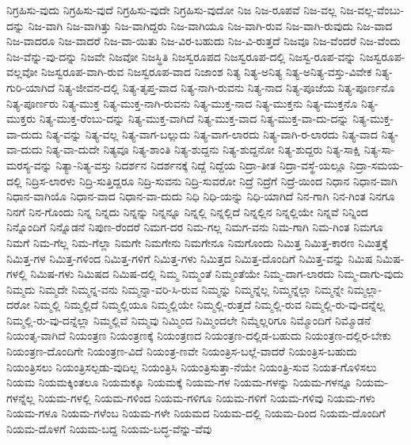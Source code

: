 {ನಿಗ್ರಹಿಸು-ವುದು
ನಿಗ್ರಹಿಸು-ವುದೆ
ನಿಗ್ರಹಿಸು-ವುದೇ
ನಿಗ್ರಹಿಸು-ವುದೋ
ನಿಜ
ನಿಜ-ರೂಪವೆ
ನಿಜ-ವಲ್ಲ
ನಿಜ-ವಲ್ಲ-ವೆಂಬು-ದನ್ನು
ನಿಜ-ವಾಗಿ
ನಿಜ-ವಾಗಿತ್ತು
ನಿಜ-ವಾಗಿದ್ದರು
ನಿಜ-ವಾಗಿಯೂ
ನಿಜ-ವಾಗಿ-ರುವ
ನಿಜ-ವಾಗಿ-ರುವುದು
ನಿಜ-ವಾದ
ನಿಜ-ವಾದರೂ
ನಿಜ-ವಾದರೆ
ನಿಜ-ವಾ-ಯಿತು
ನಿಜ-ವಿರ-ಬಹುದು
ನಿಜ-ವಿ-ರುತ್ತದೆ
ನಿಜವೂ
ನಿಜ-ವೆಂದರೆ
ನಿಜ-ವೆಂದು
ನಿಜ-ವೆನ್ನು-ವು-ದನ್ನು
ನಿಜವೇ
ನಿಜವೋ
ನಿಜಸ್ಥಿತಿ
ನಿಜಸ್ವರೂಪದ
ನಿಜಸ್ವರೂಪ-ದಲ್ಲಿ
ನಿಜಸ್ವ-ರೂಪ-ವನ್ನು
ನಿಜಸ್ವರೂಪ-ವಲ್ಲವೋ
ನಿಜಸ್ವರೂಪ-ವಾಗಿ-ರುವ
ನಿಜಸ್ವರೂಪ-ವಾದ
ನಿಜಾಂಶ
ನಿತ್ಯ
ನಿತ್ಯ-ಅನಿತ್ಯ
ನಿತ್ಯ-ಅನಿತ್ಯ-ವಸ್ತು-ವಿವೇಕ
ನಿತ್ಯ-ಗುರಿ-ಯಾಗಿದೆ
ನಿತ್ಯ-ಜೀವನ-ದಲ್ಲಿ
ನಿತ್ಯ-ತೃಪ್ತ-ವಾದ
ನಿತ್ಯ-ನಾಗಿ-ರುವನು
ನಿತ್ಯ-ನಾದ
ನಿತ್ಯ-ಪೂಜೆಯ
ನಿತ್ಯ-ಪೂರ್ಣನೊ
ನಿತ್ಯ-ಪೂರ್ಣರು
ನಿತ್ಯ-ಮುಕ್ತ
ನಿತ್ಯ-ಮುಕ್ತ-ನಾಗಿ-ರುವನು
ನಿತ್ಯ-ಮುಕ್ತ-ನಾದ
ನಿತ್ಯ-ಮುಕ್ತನು
ನಿತ್ಯ-ಮುಕ್ತನೊ
ನಿತ್ಯ-ಮುಕ್ತರು
ನಿತ್ಯ-ಮುಕ್ತ-ರೆಂಬು-ದನ್ನು
ನಿತ್ಯ-ಮುಕ್ತ-ವಾಗಿದೆ
ನಿತ್ಯ-ಮುಕ್ತ-ವಾದ
ನಿತ್ಯ-ಮುಕ್ತ-ವಾ-ದು-ದನ್ನು
ನಿತ್ಯ-ಮುಕ್ತ-ವಾ-ದುದು
ನಿತ್ಯ-ವನ್ನು
ನಿತ್ಯ-ವಲ್ಲ
ನಿತ್ಯ-ವಾಗ-ಬಲ್ಲುದು
ನಿತ್ಯ-ವಾಗ-ಲಾರದು
ನಿತ್ಯ-ವಾಗಿ-ರ-ಲಾರದು
ನಿತ್ಯ-ವಾದ
ನಿತ್ಯ-ವಾ-ದುದು
ನಿತ್ಯ-ವಾ-ದುದೇ
ನಿತ್ಯವೂ
ನಿತ್ಯ-ಶಾಂತಿ
ನಿತ್ಯ-ಶುದ್ದನು
ನಿತ್ಯ-ಶುದ್ದನೋ
ನಿತ್ಯ-ಶುದ್ದರು
ನಿತ್ಯ-ಸಾಕ್ಷಿ
ನಿತ್ಯ-ಸಾ-ಮರಸ್ಯ-ವನ್ನು
ನಿತ್ಯಾ-ನಿತ್ಯ-ವಸ್ತು
ನಿದರ್ಶನ
ನಿದರ್ಶನಕ್ಕೆ
ನಿದ್ದೆ
ನಿದ್ದೆಯ
ನಿದ್ರಾ-ತೀತ
ನಿದ್ರಾ-ವಸ್ಥೆ-ಯಲ್ಲೂ
ನಿದ್ರಾ-ಸಮಯ-ದಲ್ಲಿ
ನಿದ್ರಿಸ-ಲಾರಳು
ನಿದ್ರಿ-ಸುತ್ತಿದ್ದರೂ
ನಿದ್ರಿ-ಸುವನು
ನಿದ್ರಿ-ಸುವರೋ
ನಿದ್ರೆ
ನಿದ್ರೆಗೆ
ನಿದ್ರೆ-ಯಿಂದ
ನಿಧಾನ
ನಿಧಾನ-ವಾಗಿ
ನಿಧಾನ-ವಾಗಿಯೊ
ನಿಧಾನ-ವಾದ
ನಿಧಾನ-ವಾ-ದುದು
ನಿಧಿ
ನಿಧಿ-ಯನ್ನು
ನಿಧಿ-ಯಾಗಿದೆ
ನಿನ-ಗಾಗಿ
ನಿನ-ಗಿಂತ
ನಿನಗೂ
ನಿನಗೆ
ನಿನ-ಗೊಂದು
ನಿನ್ನ
ನಿನ್ನದು
ನಿನ್ನನ್ನು
ನಿನ್ನನ್ನೂ
ನಿನ್ನಲ್ಲಿ
ನಿನ್ನಲ್ಲಿದೆ
ನಿನ್ನಲ್ಲಿನ
ನಿನ್ನಲ್ಲಿಯೇ
ನಿನ್ನವೆ
ನಿನ್ನಿಂದ
ನಿನ್ನೊಂದಿಗೆ
ನಿನ್ನೊಡನೆ
ನಿಪುಣ-ರೆಂದರೆ
ನಿಮಗ-ದರ
ನಿಮ-ಗಲ್ಲ
ನಿಮಗ-ವನು
ನಿಮ-ಗಾಗಿ
ನಿಮ-ಗಿಂತ
ನಿಮಗೂ
ನಿಮಗೆ
ನಿಮ-ಗೆಲ್ಲ
ನಿಮ-ಗೆಲ್ಲಾ
ನಿಮಗೇ
ನಿಮಗೇನು
ನಿಮಗೇನೂ
ನಿಮಗೊಂದು
ನಿಮಿತ್ತ
ನಿಮಿತ್ತ-ಕಾರಣ
ನಿಮಿತ್ತಕ್ಕೆ
ನಿಮಿತ್ತ-ಗಳ
ನಿಮಿತ್ತ-ಗಳಿಂದ
ನಿಮಿತ್ತ-ಗಳಿಗೆ
ನಿಮಿತ್ತ-ಗಳು
ನಿಮಿತ್ತದ
ನಿಮಿತ್ತ-ದೊಂದಿಗೆ
ನಿಮಿತ್ತ-ವನ್ನು
ನಿಮಿಷ
ನಿಮಿಷ-ಗಳಲ್ಲಿ
ನಿಮಿಷ-ಗಳು
ನಿಮಿಷದ
ನಿಮಿಷ-ದಲ್ಲಿ
ನಿಮ್ಮ
ನಿಮ್ಮಂತೆ
ನಿಮ್ಮಂತೆಯೇ
ನಿಮ್ಮ-ದಾಗ-ಲಾರದು
ನಿಮ್ಮ-ದಾಗು-ವುದು
ನಿಮ್ಮದು
ನಿಮ್ಮದೇ
ನಿಮ್ಮನ್ನ-ವನು
ನಿಮ್ಮನ್ನಾ-ವರಿ-ಸಿ-ರುವ
ನಿಮ್ಮನ್ನು
ನಿಮ್ಮನ್ನೆಲ್ಲ
ನಿಮ್ಮನ್ನೆಲ್ಲಾ
ನಿಮ್ಮನ್ನೇ
ನಿಮ್ಮಲ್ಲಾ-ದರೋ
ನಿಮ್ಮಲ್ಲಿ
ನಿಮ್ಮಲ್ಲಿದೆ
ನಿಮ್ಮಲ್ಲಿಯೂ
ನಿಮ್ಮಲ್ಲಿಯೇ
ನಿಮ್ಮಲ್ಲಿ-ರುತ್ತದೆ
ನಿಮ್ಮಲ್ಲಿ-ರುವ
ನಿಮ್ಮಲ್ಲಿ-ರು-ವು-ದನ್ನೆಲ್ಲ
ನಿಮ್ಮಲ್ಲಿ-ರು-ವು-ದನ್ನೆಲ್ಲಾ
ನಿಮ್ಮಲ್ಲಿವೆ
ನಿಮ್ಮವು
ನಿಮ್ಮಿಂದ
ನಿಮ್ಮಿಂದಲೇ
ನಿಮ್ಮೆಲ್ಲರಿಗೂ
ನಿಮ್ಮೊಂದಿಗೆ
ನಿಮ್ಮೊಡನೆ
ನಿಯಂತೃ-ವಾಗಿದೆ
ನಿಯಂತ್ರಣ
ನಿಯಂತ್ರಣಕ್ಕೆ
ನಿಯಂತ್ರಣದ
ನಿಯಂತ್ರಣ-ದಲ್ಲಿಡ-ಬಹುದು
ನಿಯಂತ್ರಣ-ದಲ್ಲಿರ-ಬೇಕು
ನಿಯಂತ್ರಣ-ದೊಂದಿಗೇ
ನಿಯಂತ್ರಣ-ವಿದೆ
ನಿಯಂತ್ರ-ಣವೇ
ನಿಯಂತ್ರಿಸ-ಬಲ್ಲೆ-ವಾದರೆ
ನಿಯಂತ್ರಿಸ-ಬಹುದು
ನಿಯಂತ್ರಿಸಲು
ನಿಯಂತ್ರಿಸಲ್ಪಡು-ವುದಿಲ್ಲ
ನಿಯಂತ್ರಿಸಿ
ನಿಯಂತ್ರಿಸುತ್ತಾ-ನೆಯೇ
ನಿಯಂತ್ರಿ-ಸುವ
ನಿಯತ-ಗೊಳಿಸಲು
ನಿಯಮ
ನಿಯಮಕ್ಕಿಂತಲೂ
ನಿಯಮಕ್ಕೂ
ನಿಯಮಕ್ಕೆ
ನಿಯಮ-ಗಳ
ನಿಯಮ-ಗಳನ್ನು
ನಿಯಮ-ಗಳನ್ನೂ
ನಿಯಮ-ಗಳನ್ನೆಲ್ಲ
ನಿಯಮ-ಗಳಲ್ಲಿ
ನಿಯಮ-ಗಳಿಂದ
ನಿಯಮ-ಗಳಿಗೂ
ನಿಯಮ-ಗಳಿಗೆ
ನಿಯಮ-ಗಳಿವು
ನಿಯಮ-ಗಳು
ನಿಯಮ-ಗಳೂ
ನಿಯಮ-ಗಳೆಂಬ
ನಿಯಮ-ಗಳೇ
ನಿಯಮದ
ನಿಯಮ-ದಲ್ಲಿ
ನಿಯಮ-ದಿಂದ
ನಿಯಮ-ದೊಂದಿಗೆ
ನಿಯಮ-ದೊಳಗೆ
ನಿಯಮ-ಬದ್ದ
ನಿಯಮ-ಬದ್ಧ-ವೆನ್ನು-ವೆವು
}
